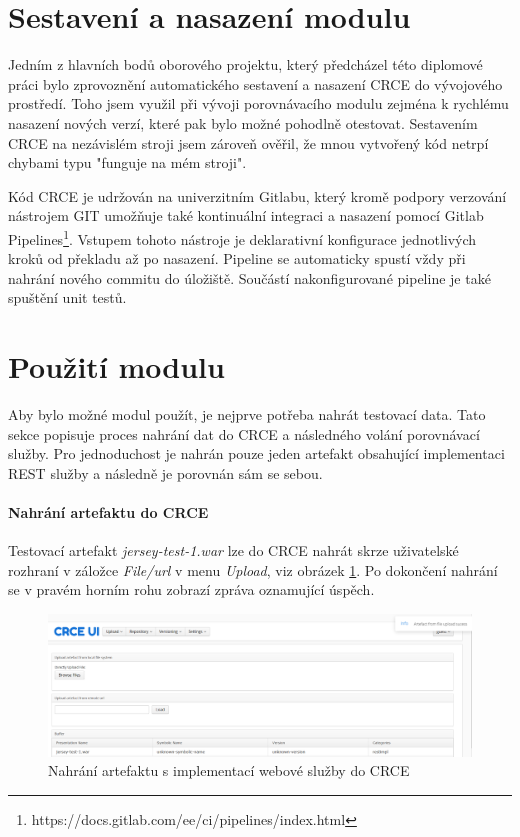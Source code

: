 \documentclass[czech,DP]{thesiskiv}
\begin{document}
\section{Sestavení a nasazení modulu}

Jedním z hlavních bodů oborového projektu, který předcházel této diplomové práci bylo zprovoznění automatického sestavení a nasazení CRCE do vývojového prostředí. Toho jsem využil při vývoji porovnávacího modulu zejména k rychlému nasazení nových verzí, které pak bylo možné pohodlně otestovat. Sestavením CRCE na nezávislém stroji jsem zároveň ověřil, že mnou vytvořený kód netrpí chybami typu "funguje na mém stroji".

Kód CRCE je udržován na univerzitním Gitlabu, který kromě podpory verzování nástrojem GIT umožňuje také kontinuální integraci a nasazení pomocí Gitlab Pipelines\footnote{https://docs.gitlab.com/ee/ci/pipelines/index.html}. Vstupem tohoto nástroje je deklarativní konfigurace jednotlivých kroků od překladu až po nasazení. Pipeline se automaticky spustí vždy při nahrání nového commitu do úložiště. Součástí nakonfigurované pipeline je také spuštění unit testů.

\section{Použití modulu}

Aby bylo možné modul použít, je nejprve potřeba nahrát testovací data. Tato sekce popisuje proces nahrání dat do CRCE a následného volání porovnávací služby. Pro jednoduchost je nahrán pouze jeden artefakt obsahující implementaci REST služby a následně je porovnán sám se sebou.

\paragraph{Nahrání artefaktu do CRCE}
Testovací artefakt \textit{jersey-test-1.war} lze do CRCE nahrát skrze uživatelské rozhraní v záložce \textit{File/url} v menu \textit{Upload}, viz obrázek \ref{fig:crce-art-upload}. Po dokončení nahrání se v pravém horním rohu zobrazí zpráva oznamující úspěch.

\begin{figure}[h]
	\centering
	\includegraphics[width=\linewidth]{crce-art-upload.png}
	\caption{Nahrání artefaktu s implementací webové služby do CRCE}
	\label{fig:crce-art-upload}
\end{figure}
\end{document}
